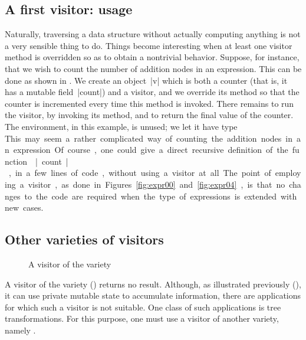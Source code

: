 \documentclass[onecolumn,11pt,nocopyrightspace]{sigplanconf}
\begin{document}
\subsection{A first visitor: usage}
\label{sec:intro:iter:usage}

Naturally, traversing a data structure without actually computing anything is
not a very sensible thing to do. Things become interesting when at least one
visitor method is overridden so as to obtain a nontrivial behavior. Suppose,
for instance, that we wish to count the number of addition nodes in an
expression. This can be done as shown in . We create an
object~\oc|v| which is both a counter (that is, it has a mutable
field~\oc|count|) and a visitor, and we override its method
 so that the counter is incremented every time this
method is invoked. There remains to run the visitor, by invoking its
 method, and to return the final value of the counter. The
environment, in this example, is unused; we let it have type \unit.

This may seem a rather complicated way of counting the addition nodes in an
expression. Of course, one could give a direct recursive definition of the
function \oc|count|, in a few lines of code, without using a visitor at all.
The point of employing a visitor, as done in Figures~\ref{fig:expr00}
and~\ref{fig:expr04}, is that no changes to the code are required when the
type of expressions is extended with new cases.


\subsection{Other varieties of visitors}
\label{sec:intro:other}

\begin{figure}[t]
\vspace{-\baselineskip}
\caption{A visitor of the \map variety}
\label{fig:expr01}
\end{figure}

A visitor of the \iter variety () returns no result.
Although, as illustrated previously (), it can use
private mutable state to accumulate information, there are applications for
which such a visitor is not suitable. One class of such applications is tree
transformations. For this purpose, one must use a visitor of another variety,
namely \map.
\end{document}
